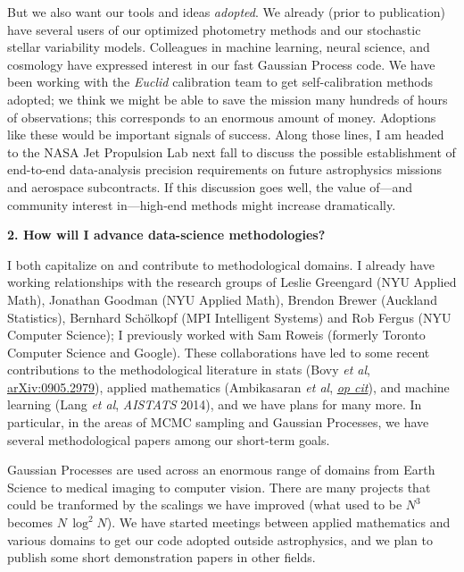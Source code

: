 \documentclass[11pt, letterpaper]{article}
\newcommand{\arxiv}[1]{\href{http://arxiv.org/abs/#1}{arXiv:#1}}
\newcommand{\opcit}[1]{\href{http://arxiv.org/abs/#1}{\textit{op cit}}}
\begin{document}
But we also want our tools and ideas \emph{adopted}.
We already (prior to publication) have several users of our
optimized photometry methods and our stochastic stellar variability
models.
Colleagues in machine learning, neural science, and cosmology have
expressed interest in our fast Gaussian Process code.
We have been working with the \textsl{Euclid} calibration team to get
self-calibration methods adopted; we think we might be able to save
the mission many hundreds of hours of observations; this corresponds to an
enormous amount of money.
Adoptions like these would be important signals of success.
Along those lines, I am headed to the NASA Jet Propulsion Lab next
fall to discuss the possible establishment of end-to-end data-analysis
precision requirements on future astrophysics missions and aerospace
subcontracts.
If this discussion goes well, the value of---and community interest
in---high-end methods might increase dramatically.

\bigskip
\noindent\textbf{2. How will I advance data-science methodologies?}
\smallskip

I both capitalize on and contribute to methodological domains.
I already have working relationships with the research groups of
Leslie Greengard (NYU Applied Math), Jonathan Goodman (NYU Applied
Math), Brendon Brewer (Auckland Statistics), Bernhard Sch\"olkopf (MPI
Intelligent Systems) and Rob Fergus (NYU Computer Science); I
previously worked with Sam Roweis (formerly Toronto Computer Science and Google).
These collaborations have led to some recent contributions to
the methodological literature in stats (Bovy \textit{et al},
\arxiv{0905.2979}), applied mathematics (Ambikasaran \textit{et al},
\opcit{1403.6015}), and machine learning (Lang \textit{et al},
\textit{AISTATS} 2014), and we have plans for many more.
In particular, in the areas of MCMC sampling and Gaussian Processes,
we have several methodological papers among our short-term goals.

Gaussian Processes are used across an enormous range of domains from
Earth Science to medical imaging to computer vision.
There are many projects that could be tranformed by the scalings we
have improved (what used to be $N^3$ becomes $N\,\log^2N$).
We have started meetings between applied mathematics and various
domains to get our code adopted outside astrophysics, and we plan to
publish some short demonstration papers in other fields.
\end{document}
